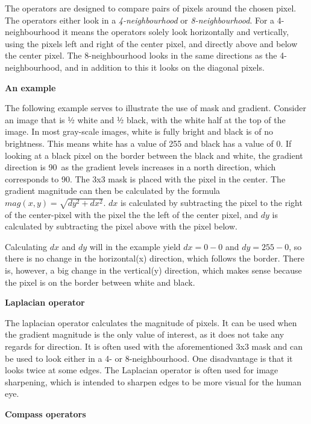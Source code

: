 The operators are designed to compare pairs of pixels around the chosen pixel. The operators either look in a \textit{4-neighbourhood} or \textit{8-neighbourhood}. For a 4-neighbourhood it means the operators solely look horizontally and vertically, using the pixels left and right of the center pixel, and directly above and below the center pixel. The 8-neighbourhood looks in the same directions as the 4-neighbourhood, and in addition to this it looks on the diagonal pixels.

\textbf{An example}

The following example serves to illustrate the use of mask and gradient.
Consider an image that is ½ white and ½ black, with the white half at the top of the image. In most gray-scale images, white is fully bright and black is of no brightness\citep{gray_scale_brightness}. This means white has a value of 255 and black has a value of 0. If looking at a black pixel on the border between the black and white, the gradient direction is 90\degree\ as the gradient levels increases in a north direction, which corresponds to 90\degree. The 3x3 mask is placed with the pixel in the center. The gradient magnitude can then be calculated by the formula $mag(x,y)=\sqrt{dy^2+dx^2}$. $dx$ is calculated by subtracting the pixel to the right of the center-pixel with the pixel the the left of the center pixel, and $dy$ is calculated by subtracting the pixel above with the pixel below. 

Calculating $dx$ and $dy$ will in the example yield $dx=0-0$ and $dy=255-0$, so there is no change in the horizontal(x) direction, which follows the border. There is, however, a big change in the vertical(y) direction, which makes sense because the pixel is on the border between white and black.

\textbf{Laplacian operator}

The laplacian operator calculates the magnitude of pixels. It can be used when the gradient magnitude is the only value of interest, as it does not take any regards for direction. It is often used with the aforementioned 3x3 mask and can be used to look either in a 4- or 8-neighbourhood. One disadvantage is that it looks twice at some edges.
The Laplacian operator is often used for image sharpening, which is intended to sharpen edges to be more visual for the human eye.

\textbf{Compass operators}

